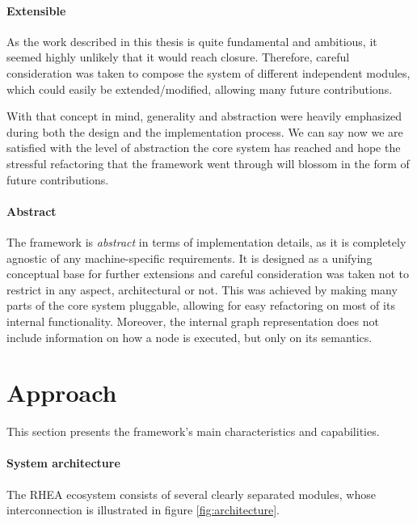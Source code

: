 \documentclass[sigplan,review,anonymous]{acmart}
\begin{document}

\paragraph{Extensible}
As the work described in this thesis is quite fundamental and ambitious, it
seemed highly unlikely that it would reach closure. Therefore, careful
consideration was taken to compose the system of different independent modules,
which could easily be extended/modified, allowing many future contributions.

With that concept in mind, generality and abstraction were heavily emphasized
during both the design and the implementation process. We can say now we are
satisfied with the level of abstraction the core system has reached and hope the
stressful refactoring that the framework went through will blossom in the form
of future contributions.

\paragraph{Abstract}
The framework is \textit{abstract} in terms of implementation details, as it is
completely agnostic of any machine-specific requirements. It is designed as a
unifying conceptual base for further extensions and careful consideration was
taken not to restrict in any aspect, architectural or not. This was achieved by
making many parts of the core system pluggable, allowing for easy refactoring on
most of its internal functionality. Moreover, the internal graph representation
does not include information on how a node is executed, but only on its
semantics.

\section{Approach} \label{sec:approach}

This section presents the framework's main characteristics and capabilities.

\paragraph{System architecture}
The \textsc{RHEA} ecosystem consists of several
clearly separated modules, whose interconnection is illustrated in figure
\ref{fig:architecture}.

\end{document}
